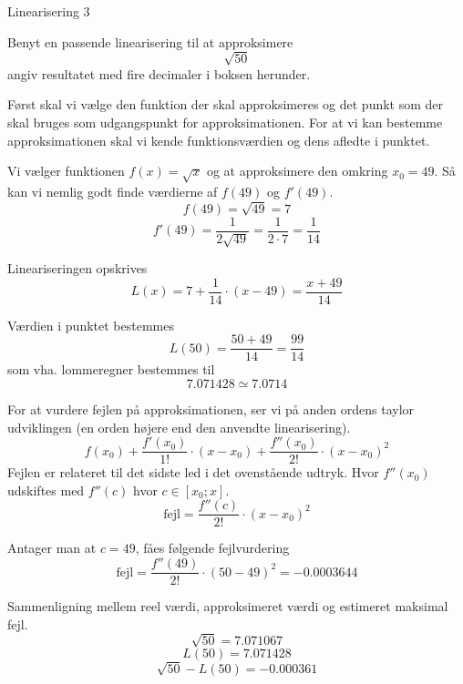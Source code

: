 \documentclass{article}
\begin{document}
\begin{exercise}{Linearisering 3}

	Benyt en passende linearisering til at approksimere
	\[
	\sqrt{50}
	\]
	angiv resultatet med fire decimaler i boksen herunder.
	
	\hint
	Først skal vi vælge den funktion der skal approksimeres
	og det punkt som der skal bruges som udgangspunkt for 
	approksimationen.
	For at vi kan bestemme approksimationen skal vi 
	kende funktionsværdien og dens afledte i punktet.
	
	\hint
	Vi vælger funktionen $f(x) = \sqrt{x}$ og at approksimere den 
	omkring $x_0 = 49$.
	Så kan vi nemlig godt finde værdierne af $f(49)$ og $f'(49)$.
	\[
	f(49) = \sqrt{49} = 7
	\]
	\[
	f'(49) = \frac{1}{2 \sqrt{49}} = \frac{1}{2 \cdot 7 } = \frac{1}{14}
	\]
	
	\hint
	Lineariseringen opskrives
	\[
	L(x) = 7 + \frac{1}{14} \cdot (x - 49) = \frac{x + 49}{14}
	\]
	
	\hint
	Værdien i punktet bestemmes
	\[
	L(50) = \frac{50 + 49}{14} = \frac{99}{14}
	\]
	som vha. lommeregner bestemmes til 
	\[
	7.071428 \simeq 7.0714
	\]
	
	\hint
	For at vurdere fejlen på approksimationen, ser vi på anden 
	ordens taylor udviklingen (en orden højere end den 
	anvendte linearisering).
	\[
	f(x_0) 
	+ \frac{f'(x_0)}{1!} \cdot (x - x_0) 
	+ \frac{f''(x_0)}{2!} \cdot (x - x_0)^2
	\]
	Fejlen er relateret til det sidste led i det ovenstående udtryk.
	Hvor $f''(x_0)$ udskiftes med $f''(c)$ hvor $c \in [x_0; x]$.
	\[
	\textrm{fejl} = \frac{f''(c)}{2!} \cdot (x - x_0)^2
	\]
	
	\hint 
	Antager man at $c = 49$, fåes følgende fejlvurdering
	\[
	\textrm{fejl} = \frac{f''(49)}{2!} \cdot (50 - 49)^2 = 
	-0.0003644\]
	
	\hint
	Sammenligning mellem reel værdi, approksimeret værdi og estimeret maksimal fejl.
	\[
	\sqrt{50}= 7.071067
	\]
	\[
	L(50) = 7.071428
	\]
	\[
	\sqrt{50} - L(50)  = -0.000361
	\]
	
\end{exercise}
\end{document}
